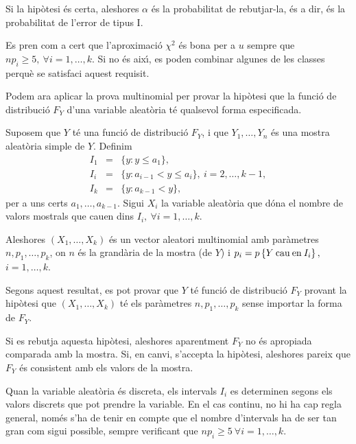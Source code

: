 Si la hip\`otesi \'es certa, aleshores $\alpha$ \'es 
la probabilitat de rebutjar-la, \'es a dir, \'es la 
probabilitat de l'error de tipus I.

Es pren com a cert que l'aproximaci\'o $\chi^2$ \'es bona per a $u$ 
sempre que \break $n p_i \geq 5, \ \forall i = 1, \ldots , k$. 
Si no \'es aix\'{\i}, es poden combinar algunes de
les classes perqu\`e se satisfaci aquest requisit.

Podem ara aplicar la prova multinomial 
per provar la hip\`otesi que la funci\'o de
distribuci\'o $F_Y$ d'una variable aleat\`oria t\'e qualsevol 
forma especificada.

\begin{proposition}
Suposem que $Y$ t\'e una funci\'o de distribuci\'o $F_Y$, i que $Y_1, 
\ldots , Y_n$ \'es una mostra aleat\`oria simple de $Y$. Definim 
\begin{eqnarray*}
I_1 & = & \{ y : y \leq a_1 \}, \\
I_i & = & \{ y : a_{i-1} < y \leq a_i \}, \ i=2,\ldots,k-1,\\
I_k & = &  \{ y : a_{k-1} < y \},
\end{eqnarray*}
per a uns certs $a_1, \ldots , a_{k-1}$.
Sigui $X_i$ la variable aleat\`oria que d\'ona el nombre de valors 
mostrals que cauen dins $I_i, \ \forall i = 1, \ldots , k$.

Aleshores $(X_1, \ldots , X_k)$ \'es un vector aleatori multinomial 
amb par\`ametres\break
{}$n, p_1, \ldots , p_k$, on $n$ \'es la 
grand\`aria de la mostra (de $Y$) i $p_i = p\left\{Y \>
{\rm cau \> en \> } I_i\right\},$\break $i = 1, \ldots , k$.
\end{proposition}

Segons aquest resultat, es pot provar que $Y$ t\'e funci\'o 
de distribuci\'o $F_Y$ provant la hip\`otesi que $(X_1, \ldots , X_k)$ 
t\'e els par\`ametres $n, p_1, \ldots , p_k$ sense importar la forma de $F_Y$.

Si es rebutja aquesta hip\`otesi, aleshores aparentment $F_Y$ 
no \'es apropiada comparada amb la mostra. Si, en canvi, s'accepta la 
hip\`otesi, aleshores pareix que $F_Y$ \'es consistent amb els valors de la mostra.

Quan la variable aleat\`oria \'es discreta, 
els intervals $I_i$ es determinen segons
els valors discrets que pot prendre la variable. En el cas continu, 
no hi ha cap regla general, nom\'es s'ha de tenir en compte que el 
nombre d'intervals ha de ser tan gran com sigui
possible, sempre verificant que $n p_i \geq 5 \ \forall i = 1, \ldots , k$.

